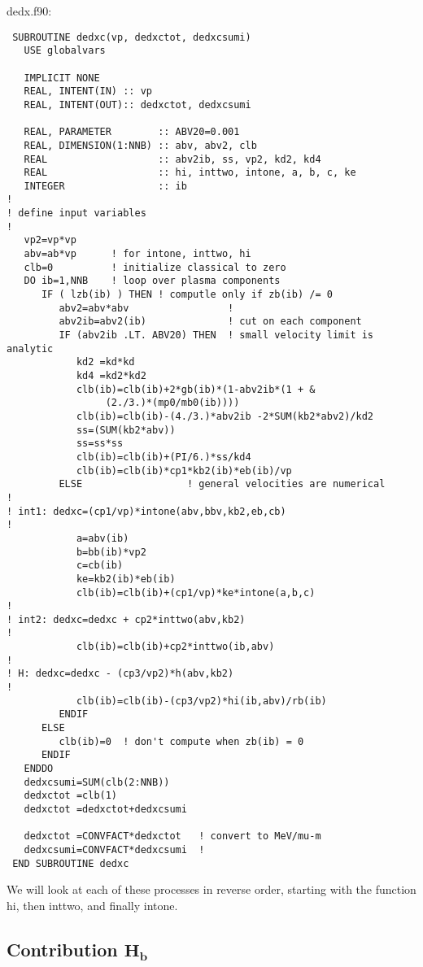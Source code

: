 \documentclass[preprint,12pt,eqsecnum,nofootinbib,amsmath,amssymb]{revtex4}
\begin{document}
\vskip0.5cm 
{
\noindent
dedx.f90:
\baselineskip12pt
\begin{verbatim}
 SUBROUTINE dedxc(vp, dedxctot, dedxcsumi)
   USE globalvars
   
   IMPLICIT NONE
   REAL, INTENT(IN) :: vp
   REAL, INTENT(OUT):: dedxctot, dedxcsumi

   REAL, PARAMETER        :: ABV20=0.001
   REAL, DIMENSION(1:NNB) :: abv, abv2, clb
   REAL                   :: abv2ib, ss, vp2, kd2, kd4
   REAL                   :: hi, inttwo, intone, a, b, c, ke
   INTEGER                :: ib
!
! define input variables
!
   vp2=vp*vp
   abv=ab*vp      ! for intone, inttwo, hi
   clb=0          ! initialize classical to zero
   DO ib=1,NNB    ! loop over plasma components
      IF ( lzb(ib) ) THEN ! computle only if zb(ib) /= 0 
         abv2=abv*abv                 !
         abv2ib=abv2(ib)              ! cut on each component
         IF (abv2ib .LT. ABV20) THEN  ! small velocity limit is analytic
            kd2 =kd*kd
            kd4 =kd2*kd2
            clb(ib)=clb(ib)+2*gb(ib)*(1-abv2ib*(1 + &
                 (2./3.)*(mp0/mb0(ib))))
            clb(ib)=clb(ib)-(4./3.)*abv2ib -2*SUM(kb2*abv2)/kd2
            ss=(SUM(kb2*abv))
            ss=ss*ss
            clb(ib)=clb(ib)+(PI/6.)*ss/kd4
            clb(ib)=clb(ib)*cp1*kb2(ib)*eb(ib)/vp 
         ELSE                  ! general velocities are numerical
!
! int1: dedxc=(cp1/vp)*intone(abv,bbv,kb2,eb,cb)
!
            a=abv(ib)
            b=bb(ib)*vp2
            c=cb(ib)
            ke=kb2(ib)*eb(ib)
            clb(ib)=clb(ib)+(cp1/vp)*ke*intone(a,b,c)
!       
! int2: dedxc=dedxc + cp2*inttwo(abv,kb2) 
!
            clb(ib)=clb(ib)+cp2*inttwo(ib,abv)
!
! H: dedxc=dedxc - (cp3/vp2)*h(abv,kb2)
!
            clb(ib)=clb(ib)-(cp3/vp2)*hi(ib,abv)/rb(ib)
         ENDIF
      ELSE
         clb(ib)=0  ! don't compute when zb(ib) = 0
      ENDIF
   ENDDO
   dedxcsumi=SUM(clb(2:NNB))
   dedxctot =clb(1)
   dedxctot =dedxctot+dedxcsumi

   dedxctot =CONVFACT*dedxctot   ! convert to MeV/mu-m
   dedxcsumi=CONVFACT*dedxcsumi  !
 END SUBROUTINE dedxc
\end{verbatim}
}

\noindent
We will look at each of these processes in reverse
order, starting with the function hi, then inttwo,
and finally intone.



\subsection{Contribution $\bm{H_b}$}
\end{document}
